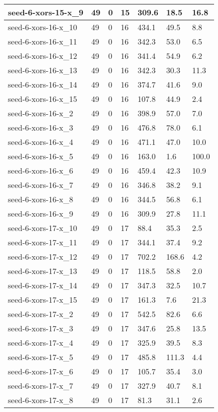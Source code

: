 \begin{scriptsize}
\begin{longtable}{|p{5cm}|l|l|l|l|l|l|}
seed-6-xors-15-x\_9&49&0&15&309.6&18.5&16.8 \\ \hline 
seed-6-xors-16-x\_10&49&0&16&434.1&49.5&8.8 \\ \hline 
seed-6-xors-16-x\_11&49&0&16&342.3&53.0&6.5 \\ \hline 
seed-6-xors-16-x\_12&49&0&16&341.4&54.9&6.2 \\ \hline 
seed-6-xors-16-x\_13&49&0&16&342.3&30.3&11.3 \\ \hline 
seed-6-xors-16-x\_14&49&0&16&374.7&41.6&9.0 \\ \hline 
seed-6-xors-16-x\_15&49&0&16&107.8&44.9&2.4 \\ \hline 
seed-6-xors-16-x\_2&49&0&16&398.9&57.0&7.0 \\ \hline 
seed-6-xors-16-x\_3&49&0&16&476.8&78.0&6.1 \\ \hline 
seed-6-xors-16-x\_4&49&0&16&471.1&47.0&10.0 \\ \hline 
seed-6-xors-16-x\_5&49&0&16&163.0&1.6&100.0 \\ \hline 
seed-6-xors-16-x\_6&49&0&16&459.4&42.3&10.9 \\ \hline 
seed-6-xors-16-x\_7&49&0&16&346.8&38.2&9.1 \\ \hline 
seed-6-xors-16-x\_8&49&0&16&344.5&56.8&6.1 \\ \hline 
seed-6-xors-16-x\_9&49&0&16&309.9&27.8&11.1 \\ \hline 
seed-6-xors-17-x\_10&49&0&17&88.4&35.3&2.5 \\ \hline 
seed-6-xors-17-x\_11&49&0&17&344.1&37.4&9.2 \\ \hline 
seed-6-xors-17-x\_12&49&0&17&702.2&168.6&4.2 \\ \hline 
seed-6-xors-17-x\_13&49&0&17&118.5&58.8&2.0 \\ \hline 
seed-6-xors-17-x\_14&49&0&17&347.3&32.5&10.7 \\ \hline 
seed-6-xors-17-x\_15&49&0&17&161.3&7.6&21.3 \\ \hline 
seed-6-xors-17-x\_2&49&0&17&542.5&82.6&6.6 \\ \hline 
seed-6-xors-17-x\_3&49&0&17&347.6&25.8&13.5 \\ \hline 
seed-6-xors-17-x\_4&49&0&17&325.9&39.5&8.3 \\ \hline 
seed-6-xors-17-x\_5&49&0&17&485.8&111.3&4.4 \\ \hline 
seed-6-xors-17-x\_6&49&0&17&105.7&35.4&3.0 \\ \hline 
seed-6-xors-17-x\_7&49&0&17&327.9&40.7&8.1 \\ \hline 
seed-6-xors-17-x\_8&49&0&17&81.3&31.1&2.6 \\ \hline 

\end{longtable}
\end{scriptsize}
